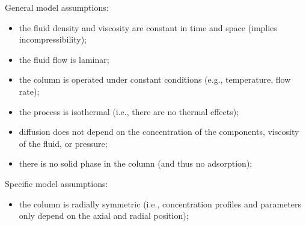 \documentclass{article}
\begin{document}
General model assumptions:
\begin{itemize}
    \item the fluid density and viscosity are constant in time and space (implies incompressibility);
    \item the fluid flow is laminar;
    \item the column is operated under constant conditions (e.g., temperature, flow rate);
    \item the process is isothermal (i.e., there are no thermal effects);
    \item diffusion does not depend on the concentration of the components, viscosity of the fluid, or pressure;
    \item there is no solid phase in the column (and thus no adsorption);
\end{itemize}

Specific model assumptions:
\begin{itemize}
    \item the column is radially symmetric (i.e., concentration profiles and parameters only depend on the axial and radial position);
\end{itemize}
\end{document}
